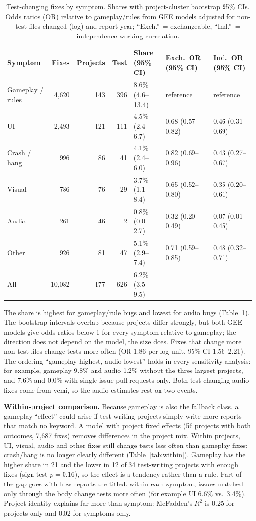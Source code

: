 \documentclass[10pt,twocolumn,a4paper]{article}
\newcommand{\para}[1]{\par\smallskip\noindent\textbf{#1}\enspace}
\begin{document}
\begin{table}[tb]
\centering
\caption{Test-changing fixes by symptom. Shares with project-cluster bootstrap 95\% CIs. Odds ratios (OR) relative to gameplay/rules from GEE models adjusted for non-test files changed (log) and report year; ``Exch.''\ = exchangeable, ``Ind.''\ = independence working correlation.}\label{tab:sym}
\small\setlength{\tabcolsep}{4pt}
\begin{tabular}{@{}lrrrlll@{}}
\toprule
Symptom & Fixes & Projects & Test & Share (95\% CI) & Exch.\ OR (95\% CI) & Ind.\ OR (95\% CI)\\
\midrule
Gameplay / rules & 4,620 & 143 & 396 & 8.6\% (4.6--13.4) & reference & reference\\
UI & 2,493 & 121 & 111 & 4.5\% (2.4--6.7) & 0.68 (0.57--0.82) & 0.46 (0.31--0.69)\\
Crash / hang & 996 & 86 & 41 & 4.1\% (2.4--6.0) & 0.82 (0.69--0.96) & 0.43 (0.27--0.67)\\
Visual & 786 & 76 & 29 & 3.7\% (1.1--8.4) & 0.65 (0.52--0.80) & 0.35 (0.20--0.61)\\
Audio & 261 & 46 & 2 & 0.8\% (0.0--2.7) & 0.32 (0.20--0.49) & 0.07 (0.01--0.45)\\
Other & 926 & 81 & 47 & 5.1\% (2.9--7.4) & 0.71 (0.59--0.85) & 0.48 (0.32--0.71)\\
\midrule
All & 10,082 & 177 & 626 & 6.2\% (3.5--9.5) & & \\
\bottomrule
\end{tabular}
\end{table}

The share is highest for gameplay/rule bugs and lowest for audio bugs (Table~\ref{tab:sym}).
The bootstrap intervals overlap because projects differ strongly, but both GEE models give odds ratios below 1 for every symptom relative to gameplay; the direction does not depend on the model, the size does.
Fixes that change more non-test files change tests more often (OR 1.86 per log-unit, 95\% CI 1.56--2.21).
The ordering ``gameplay highest, audio lowest'' holds in every sensitivity analysis: for example, gameplay 9.8\% and audio 1.2\% without the three largest projects, and 7.6\% and 0.0\% with single-issue pull requests only.
Both test-changing audio fixes come from vcmi, so the audio estimates rest on two events.

\para{Within-project comparison.}
Because gameplay is also the fallback class, a gameplay ``effect'' could arise if test-writing projects simply write more reports that match no keyword.
A model with project fixed effects (56 projects with both outcomes, 7,687 fixes) removes differences in the project mix.
Within projects, UI, visual, audio and other fixes still change tests less often than gameplay fixes; crash/hang is no longer clearly different (Table~\ref{tab:within}).
Gameplay has the higher share in 21 and the lower in 12 of 34 test-writing projects with enough fixes (sign test $p=0.16$), so the effect is a tendency rather than a rule.
Part of the gap goes with how reports are titled: within each symptom, issues matched only through the body change tests more often (for example UI 6.6\% vs.\ 3.4\%).
Project identity explains far more than symptom: McFadden's $R^2$ is 0.25 for projects only and 0.02 for symptoms only.
\end{document}
